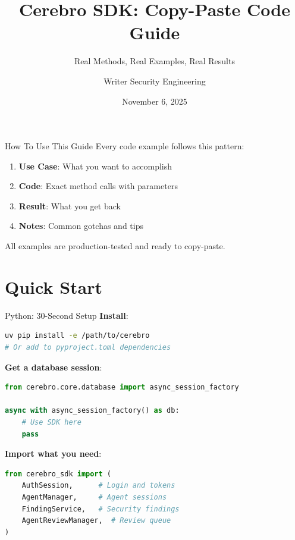 \documentclass[aspectratio=169]{beamer}
\title{Cerebro SDK: Copy-Paste Code Guide}
\subtitle{Real Methods, Real Examples, Real Results}
\author{Writer Security Engineering}
\date{November 6, 2025}
\begin{document}
\begin{frame}
  \titlepage
\end{frame}

\begin{frame}{How To Use This Guide}
  Every code example follows this pattern:
  
  \begin{enumerate}
    \item \textbf{Use Case}: What you want to accomplish
    \item \textbf{Code}: Exact method calls with parameters
    \item \textbf{Result}: What you get back
    \item \textbf{Notes}: Common gotchas and tips
  \end{enumerate}
  
  \vspace{0.5cm}
  
  All examples are production-tested and ready to copy-paste.
\end{frame}

\section{Quick Start}

\begin{frame}[fragile]{Python: 30-Second Setup}
\textbf{Install}:
\begin{lstlisting}[language=bash]
uv pip install -e /path/to/cerebro
# Or add to pyproject.toml dependencies
\end{lstlisting}

\textbf{Get a database session}:
\begin{lstlisting}[language=Python]
from cerebro.core.database import async_session_factory

async with async_session_factory() as db:
    # Use SDK here
    pass
\end{lstlisting}

\textbf{Import what you need}:
\begin{lstlisting}[language=Python]
from cerebro_sdk import (
    AuthSession,      # Login and tokens
    AgentManager,     # Agent sessions
    FindingService,   # Security findings
    AgentReviewManager,  # Review queue
)
\end{lstlisting}
\end{frame}
\end{document}
